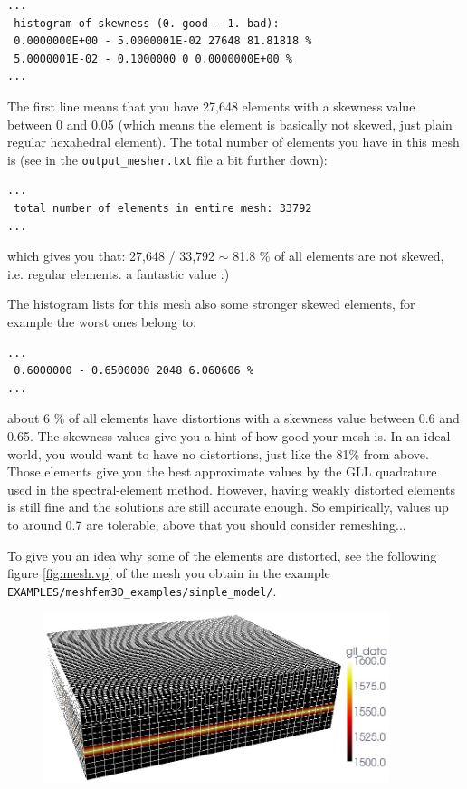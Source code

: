 \begin{description}
{\footnotesize
\begin{verbatim}
...
 histogram of skewness (0. good - 1. bad):
 0.0000000E+00 - 5.0000001E-02 27648 81.81818 %
 5.0000001E-02 - 0.1000000 0 0.0000000E+00 %
...
\end{verbatim}
}

The first line means that you have 27,648 elements with a skewness
value between 0 and 0.05 (which means the element is basically not
skewed, just plain regular hexahedral element). The total number of
elements you have in this mesh is (see in the \texttt{output\_mesher.txt}
file a bit further down):

{\footnotesize
\begin{verbatim}
...
 total number of elements in entire mesh: 33792
...
\end{verbatim}
}

which gives you that: 27,648 / 33,792 $\sim$ 81.8 \% of all elements
are not skewed, i.e. regular elements. a fantastic value :)\newline


The histogram lists for this mesh also some stronger skewed elements,
for example the worst ones belong to:

{\footnotesize
\begin{verbatim}
...
 0.6000000 - 0.6500000 2048 6.060606 %
...

\end{verbatim}
}

about 6 \% of all elements have distortions with a skewness value
between 0.6 and 0.65. The skewness values give you a hint of how good
your mesh is. In an ideal world, you would want to have no distortions,
just like the 81\% from above. Those elements give you the best approximate
values by the GLL quadrature used in the spectral-element method.
However, having weakly distorted elements is still fine and the solutions
are still accurate enough. So empirically, values up to around 0.7
are tolerable, above that you should consider remeshing...\newline


To give you an idea why some of the elements are distorted, see the
following figure \ref{fig:mesh.vp} of the mesh you obtain in the
example \texttt{EXAMPLES/meshfem3D\_examples/simple\_model/}.
\begin{figure}[htbp]
\noindent \begin{centering}
\includegraphics[width=0.9\textwidth]{figures/mesh_vp.jpg}
\par\end{centering}


\end{figure}
\end{description}
